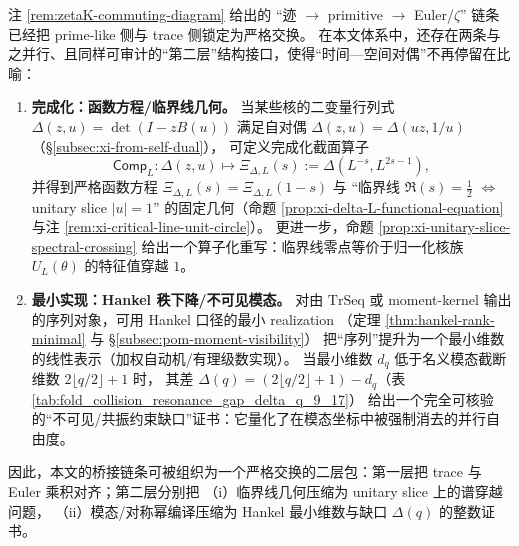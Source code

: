 \begin{remark}\label{rem:two_layer_bridge_package_completed_minH}
注 \ref{rem:zetaK-commuting-diagram} 给出的 “迹 $\to$ primitive $\to$ Euler/\(\zeta\)” 链条已经把 prime-like 侧与 trace 侧锁定为严格交换。
在本文体系中，还存在两条与之并行、且同样可审计的“第二层”结构接口，使得“时间—空间对偶”不再停留在比喻：
\begin{enumerate}
  \item \textbf{完成化：函数方程/临界线几何。}
  当某些核的二变量行列式
  \(
  \Delta(z,u)=\det(I-zB(u))
  \)
  满足自对偶 \(\Delta(z,u)=\Delta(uz,1/u)\)（\S\ref{subsec:xi-from-self-dual}），
  可定义完成化截面算子
  \[
  \mathsf{Comp}_L:\Delta(z,u)\longmapsto \Xi_{\Delta,L}(s):=\Delta(L^{-s},L^{2s-1}),
  \]
  并得到严格函数方程 \(\Xi_{\Delta,L}(s)=\Xi_{\Delta,L}(1-s)\) 与
  “临界线 \(\Re(s)=\tfrac12\) \(\Leftrightarrow\) unitary slice \(|u|=1\)” 的固定几何（命题 \ref{prop:xi-delta-L-functional-equation} 与注 \ref{rem:xi-critical-line-unit-circle}）。
  更进一步，命题 \ref{prop:xi-unitary-slice-spectral-crossing} 给出一个算子化重写：临界线零点等价于归一化核族 \(U_L(\theta)\) 的特征值穿越 \(1\)。
  \item \textbf{最小实现：Hankel 秩下降/不可见模态。}
  对由 \(\mathrm{TrSeq}\) 或 moment-kernel 输出的序列对象，可用 Hankel 口径的最小 realization
  （定理 \ref{thm:hankel-rank-minimal} 与 \S\ref{subsec:pom-moment-visibility}）
  把“序列”提升为一个最小维数的线性表示（加权自动机/有理级数实现）。
  当最小维数 \(d_q\) 低于名义模态截断维数 \(2\lfloor q/2\rfloor+1\) 时，
  其差 \(\Delta(q)=(2\lfloor q/2\rfloor+1)-d_q\)（表 \ref{tab:fold_collision_resonance_gap_delta_q_9_17}）
  给出一个完全可核验的“不可见/共振约束缺口”证书：它量化了在模态坐标中被强制消去的并行自由度。
\end{enumerate}
因此，本文的桥接链条可被组织为一个严格交换的二层包：第一层把 trace 与 Euler 乘积对齐；第二层分别把
（i）临界线几何压缩为 unitary slice 上的谱穿越问题，
（ii）模态/对称幂编译压缩为 Hankel 最小维数与缺口 \(\Delta(q)\) 的整数证书。
\end{remark}

